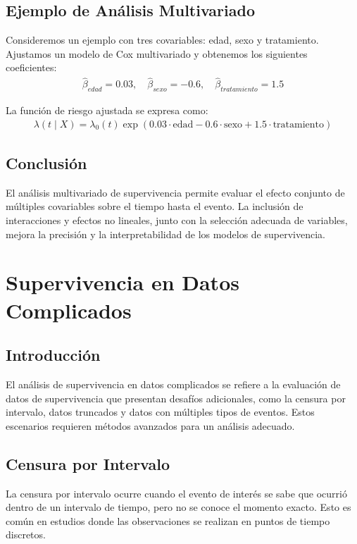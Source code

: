 \documentclass[a4paper]{report} %
\begin{document}
\section{Ejemplo de An\'alisis Multivariado}
Consideremos un ejemplo con tres covariables: edad, sexo y tratamiento. Ajustamos un modelo de Cox multivariado y obtenemos los siguientes coeficientes:
\begin{eqnarray*}
\hat{\beta}_{edad} = 0.03, \quad \hat{\beta}_{sexo} = -0.6, \quad \hat{\beta}_{tratamiento} = 1.5
\end{eqnarray*}

La funci\'on de riesgo ajustada se expresa como:
\begin{eqnarray*}
\lambda(t \mid X) = \lambda_0(t) \exp(0.03 \cdot \text{edad} - 0.6 \cdot \text{sexo} + 1.5 \cdot \text{tratamiento})
\end{eqnarray*}

\section{Conclusi\'on}
El an\'alisis multivariado de supervivencia permite evaluar el efecto conjunto de m\'ultiples covariables sobre el tiempo hasta el evento. La inclusi\'on de interacciones y efectos no lineales, junto con la selecci\'on adecuada de variables, mejora la precisi\'on y la interpretabilidad de los modelos de supervivencia.



\chapter{Supervivencia en Datos Complicados}

\section{Introducci\'on}
El an\'alisis de supervivencia en datos complicados se refiere a la evaluaci\'on de datos de supervivencia que presentan desaf\'ios adicionales, como la censura por intervalo, datos truncados y datos con m\'ultiples tipos de eventos. Estos escenarios requieren m\'etodos avanzados para un an\'alisis adecuado.

\section{Censura por Intervalo}
La censura por intervalo ocurre cuando el evento de inter\'es se sabe que ocurri\'o dentro de un intervalo de tiempo, pero no se conoce el momento exacto. Esto es com\'un en estudios donde las observaciones se realizan en puntos de tiempo discretos.
\end{document}
